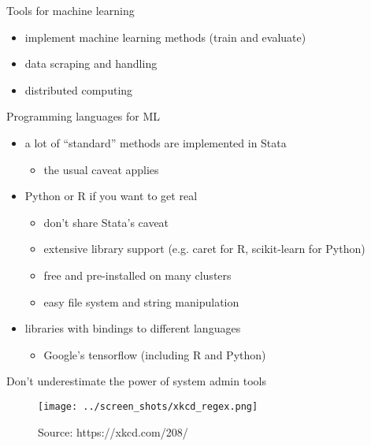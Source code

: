 \documentclass[xcolor=dvipsnames, handout]{beamer}
\begin{document}
\begin{frame}{Tools for machine learning}
\begin{itemize}
  \item implement machine learning methods (train and evaluate)
  \item data scraping and handling 
  \item distributed computing 
\end{itemize}
\end{frame}


\begin{frame}{Programming languages for ML}
\begin{itemize}
  \item a lot of ``standard'' methods are implemented in Stata
  \begin{itemize}
    \item the usual caveat applies 
  \end{itemize}
  \item Python or R if you want to get real
  \begin{itemize}
    \item don't share Stata's caveat
    \item extensive library support (e.g. caret for R, scikit-learn for Python)
    \item free and pre-installed on many clusters
    \item easy file system and string manipulation 
  \end{itemize}
  \item libraries with bindings to different languages
  \begin{itemize}
    \item Google's tensorflow (including R and Python)
  \end{itemize}
  \end{itemize}
\end{frame}


\begin{frame}{Don't underestimate the power of system admin tools}
\begin{figure}
  \texttt{[image: ../screen\_shots/xkcd\_regex.png]}
   \caption{Source: https://xkcd.com/208/}
\end{figure}
\end{frame}
\end{document}
